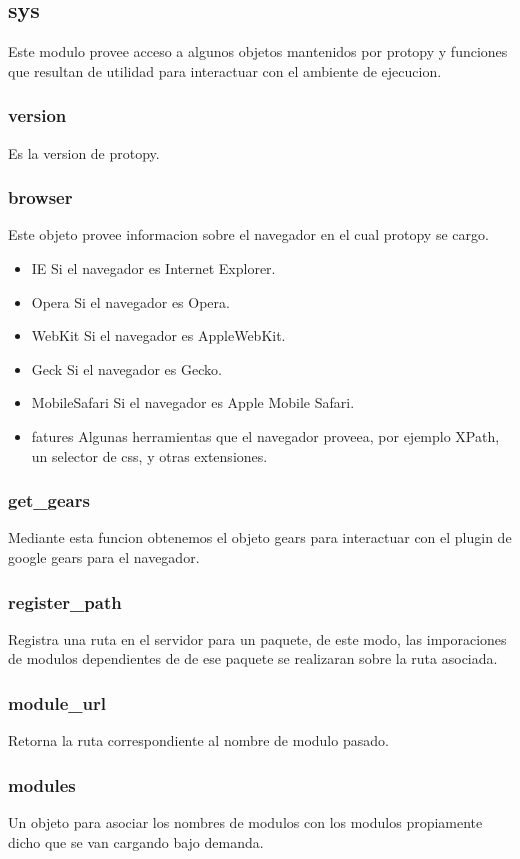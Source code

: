 \subsection{sys}
Este modulo provee acceso a algunos objetos mantenidos por protopy y funciones
que resultan de utilidad para interactuar con el ambiente de ejecucion.
\subsubsection*{version}
Es la version de protopy.
\subsubsection*{browser}
Este objeto provee informacion sobre el navegador en el cual protopy se cargo.
\begin{itemize}
 \item{IE} Si el navegador es Internet Explorer.
 \item{Opera} Si el navegador es Opera.
 \item{WebKit} Si el navegador es AppleWebKit.
 \item{Geck} Si el navegador es Gecko.
 \item{MobileSafari} Si el navegador es Apple Mobile Safari.
 \item{fatures} Algunas herramientas que el navegador proveea, por ejemplo
XPath, un selector de css, y otras extensiones.
\end{itemize}

\subsubsection*{get\_gears}
Mediante esta funcion obtenemos el objeto gears para interactuar con el plugin
de google gears para el navegador.
\subsubsection*{register\_path}
Registra una ruta en el servidor para un paquete, de este modo, las imporaciones
de modulos dependientes de de ese paquete se realizaran sobre la ruta asociada. 
\subsubsection*{module\_url}
Retorna la ruta correspondiente al nombre de modulo pasado.
\subsubsection*{modules}
Un objeto para asociar los nombres de modulos con los modulos propiamente dicho
que se van cargando bajo demanda.

